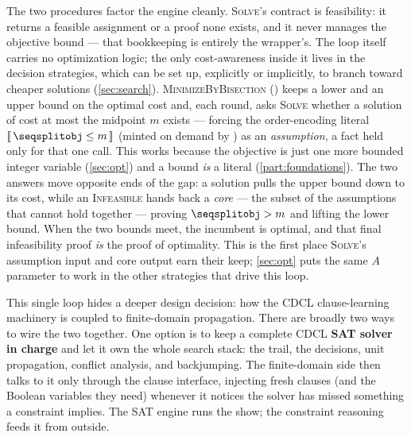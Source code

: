 The two procedures factor the engine cleanly. \textsc{Solve}'s contract is
feasibility: it returns a feasible assignment or a proof none exists, and it never
manages the objective bound --- that bookkeeping is entirely the wrapper's. The
loop itself carries no optimization logic; the only cost-awareness inside it lives
in the decision strategies, which can be set up, explicitly or implicitly, to
branch toward cheaper solutions (\cref{sec:search}). \textsc{MinimizeByBisection}
() keeps a
lower and an upper bound on the
optimal cost and, each round, asks \textsc{Solve} whether a solution of cost at most
the midpoint $m$ exists --- forcing the order-encoding literal
$\bl{\, \code{obj} \le m \,}$ (minted on demand by
) as an \emph{assumption}, a fact held
only for that one call. This works because the objective is just one more bounded
integer variable (\cref{sec:opt}) and a bound \emph{is} a literal
(\cref{part:foundations}). The two answers move opposite ends of the gap: a solution
pulls the upper bound down to its cost, while an \textsc{Infeasible} hands back a
\emph{core} --- the subset of the assumptions that cannot hold together --- proving
$\code{obj} > m$ and lifting the lower bound. When the two bounds meet, the incumbent
is optimal, and that final infeasibility proof \emph{is} the proof of optimality.
This is the first place \textsc{Solve}'s assumption input and core output earn their
keep; \cref{sec:opt} puts the same $A$ parameter to work in the other
strategies that drive this loop.

This single loop hides a deeper design decision: how the CDCL clause-learning
machinery is coupled to finite-domain propagation. There are broadly two ways to
wire the two together. One option is to keep a complete CDCL \textbf{SAT solver in
charge} and let it own the whole search stack: the trail, the decisions, unit
propagation, conflict analysis, and backjumping. The finite-domain side then talks
to it only through the clause interface, injecting fresh clauses (and the Boolean
variables they need) whenever it notices the solver has missed something a
constraint implies. The SAT engine runs the show; the constraint reasoning feeds
it from outside.

